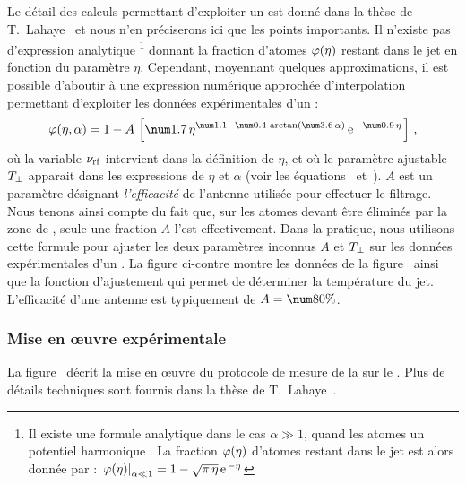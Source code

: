 Le détail des calculs permettant d'exploiter un \spfirf est donné dans la thèse de T.~Lahaye~\cite{TTL} et nous n'en préciserons ici que les points importants.
Il n'existe pas d'expression analytique%
%
\footnote{Il existe une formule analytique dans le cas $\alpha \gg 1$, \cad quand les atomes  un potentiel harmonique \bd. La fraction ${\varphi}(\eta)$ d'atomes restant dans le jet est alors donnée par : $ \left. {\varphi}(\eta) \right|_{\alpha \ll 1} = 1 - \sqrt{\pi\,\eta}\,\mathrm{e}^{\left.-\eta\right.}$} %
%
 donnant la fraction d'atomes ${\varphi}(\eta)$ restant dans le jet en fonction du paramètre $\eta$. 
%
Cependant, moyennant quelques approximations, il est possible d'aboutir à une expression numérique approchée d'interpolation permettant d'exploiter les données expérimentales d'un \spfirf :
\vspace{-1ex}
\begin{equation}
	\rapflux(\eta, \alpha) 
	 = 1 - A\,\left[ \val{1.7}\, \eta^{\val{1.1} - \val{0.4}\,\arctan(\val{3.6}\,\alpha)}
	\,\expo{-\val{0.9}\,\eta} \right] \nonumber
	\virguleformule
\label{eq:FitFunctionRapFlux}
\end{equation}
où la variable ${\nu_{\rm rf}}$ intervient dans la définition de $\eta$, et où le paramètre ajustable $T_{\bot}$ apparait dans les expressions de $\eta$ et $\alpha$ (voir les équations~ et~).
$A$ est un paramètre désignant \emph{l'efficacité} de l'antenne \rf utilisée pour effectuer le filtrage. Nous tenons ainsi compte du fait que, sur les atomes devant être éliminés par la zone de \firf, seule une fraction $A$ l'est effectivement.
Dans la pratique, nous utilisons cette formule pour ajuster les deux paramètres inconnus $A$ et $T_{\bot}$ sur les données expérimentales d'un \spfirf. La figure ci-contre montre les données de la figure~ ainsi que la fonction d'ajustement qui permet de déterminer la température du jet. 
L'efficacité d'une antenne est typiquement de $A = \val{80}\%$.


\subsubsection{Mise en \oe uvre expérimentale}
La figure~ décrit la mise en \oe uvre du protocole de mesure de la \tempt sur le \setup. 
Plus de détails techniques sont fournis dans la thèse de T.~Lahaye~\cite{TTL}.

